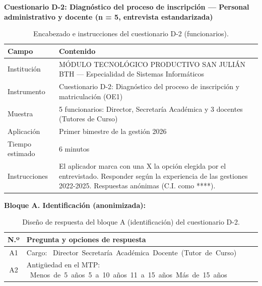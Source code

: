 \vspace{0.4cm}
\noindent\textbf{Cuestionario D-2: Diagnóstico del proceso de inscripción --- Personal administrativo y docente (n = 5, entrevista estandarizada)}

\begin{table}[H]
    \centering
    \caption{Encabezado e instrucciones del cuestionario D-2 (funcionarios).}
    \label{tab:d2_encabezado}
    \begin{tabularx}{\textwidth}{p{} X}
        \toprule
        \textbf{Campo} & \textbf{Contenido} \\
        \midrule
        Institución & MÓDULO TECNOLÓGICO PRODUCTIVO SAN JULIÁN BTH --- Especialidad de Sistemas Informáticos \\
        Instrumento & Cuestionario D-2: Diagnóstico del proceso de inscripción y matriculación (OE1) \\
        Muestra & 5 funcionarios: Director, Secretaría Académica y 3 docentes (Tutores de Curso) \\
        Aplicación & Primer bimestre de la gestión 2026 \\
        Tiempo estimado & 6 minutos \\
        Instrucciones & El aplicador marca con una X la opción elegida por el entrevistado. Responder según la experiencia de las gestiones 2022-2025. Respuestas anónimas (C.I. como ****). \\
        \bottomrule
    \end{tabularx}
\end{table}

\Needspace{6cm}
\noindent\textbf{Bloque A. Identificación (anonimizada):}

\begin{table}[H]
    \centering
    \caption{Diseño de respuesta del bloque A (identificación) del cuestionario D-2.}
    \label{tab:d2_identificacion}
    \renewcommand{\arraystretch}{1.60}
    \begin{tabularx}{\textwidth}{c L}
        \toprule
        \textbf{N.º} & \textbf{Pregunta y opciones de respuesta} \\
        \midrule
        A1 & Cargo:\newline
            \mbox{\casilla{} Director}\quad \mbox{\casilla{} Secretaría Académica}\quad \mbox{\casilla{} Docente (Tutor de Curso)} \\
        \addlinespace
        A2 & Antigüedad en el MTP:\newline
            \mbox{\casilla{} Menos de 5 años}\quad \mbox{\casilla{} 5 a 10 años}\quad \mbox{\casilla{} 11 a 15 años}\quad \mbox{\casilla{} Más de 15 años} \\
        \bottomrule
    \end{tabularx}
\end{table}

